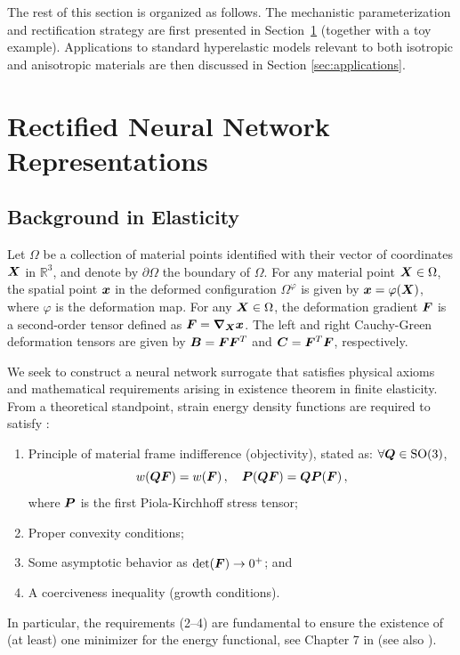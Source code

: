 The rest of this section is organized as follows. The mechanistic parameterization and rectification strategy are first presented in Section~\ref{sec:rectifiers} (together with a toy example). Applications to standard hyperelastic models relevant to both isotropic and anisotropic materials are then discussed in Section \ref{sec:applications}.

\section{Rectified Neural Network Representations}
\label{sec:rectifiers}

\subsection{Background in Elasticity}
Let $\Omega$ be a collection of material points identified with their vector of coordinates $\boldsymbol{X}$ in $\mathbb{R}^3$, and denote by $\partial \Omega$ the boundary of $\Omega$. For any material point $\boldsymbol{X} \in \Omega$, the spatial point $\boldsymbol{x}$ in the deformed configuration $\Omega^\varphi$ is given by $\boldsymbol{x} = \varphi (\boldsymbol{X})$, where $\varphi$ is the deformation map. For any $\boldsymbol{X} \in \Omega$, the deformation gradient $\boldsymbol{F}$ is a second-order tensor defined as $\boldsymbol{F} = \boldsymbol{\nabla}_{\boldsymbol{X}} \boldsymbol{x}$. The left and right Cauchy-Green deformation tensors are given by $\boldsymbol{B} = \boldsymbol{F} \boldsymbol{F}^T$ and $\boldsymbol{C} = \boldsymbol{F}^T \boldsymbol{F}$, respectively.

We seek to construct a neural network surrogate that satisfies physical axioms and mathematical requirements arising in existence theorem in finite elasticity. From a theoretical standpoint, strain energy density functions are required to satisfy \cite{ciarlet1988mathematical,truesdell2004non}:
\begin{enumerate}
    \item Principle of material frame indifference (objectivity), stated as: $\forall \boldsymbol{Q} \in \mathrm{SO}(3)$,
    \begin{equation}
            w(\boldsymbol{Q} \boldsymbol{F}) = w(\boldsymbol{F})\,, \quad \boldsymbol{P}(\boldsymbol{Q} \boldsymbol{F}) = \boldsymbol{Q} \boldsymbol{P}(\boldsymbol{F})\,,
    \end{equation}
    where $\boldsymbol{P}$ is the first Piola-Kirchhoff stress tensor;
    \item Proper convexity conditions; 
    \item Some asymptotic behavior as $\det (\boldsymbol{F}) \to 0^+$; and
    \item A coerciveness inequality (growth conditions).
\end{enumerate}
In particular, the requirements (2--4) are fundamental to ensure the existence of (at least) one minimizer for the energy functional, see Chapter 7 in \cite{ciarlet1988mathematical} (see also \cite{pedregal2000variational,Dacorogna1989}).

